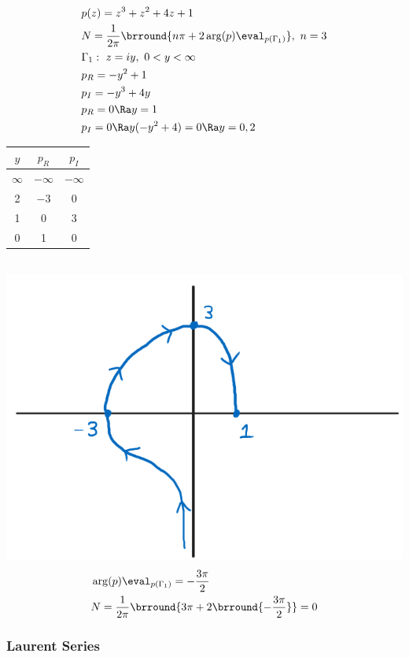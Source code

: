 \begin{align*}
    &p(z)=z^3+z^2+4z+1\\
    &N=\frac{1}{2\pi}\brround{n\pi+2\arg(p)\eval_{p(\Gamma_1)}},\ n=3\\
    &\Gamma_1:\ z=iy,\ 0<y<\infty\\
    &p_R=-y^2+1\\
    &p_I=-y^3+4y\\
    &p_R=0\Ra y=1\\
    &p_I=0\Ra y(-y^2+4)=0\Ra y=0,2
\end{align*}
\begin{tabular}{c|c|c}
    $y$ & $p_R$ & $p_I$\\
    \hline
    $\infty$ & $-\infty$ & $-\infty$\\
    2 & $-3$ & 0\\
    1 & 0 & 3\\
    0 & 1 & 0
\end{tabular}\\
\includegraphics[scale=0.5]{Images/ComplexAnalysisPictures/Q7.png}
\begin{align*}
    &\arg(p)\eval_{p(\Gamma_1)}=-\frac{3\pi}{2}\\
    &N=\frac{1}{2\pi}\brround{3\pi+2\brround{-\frac{3\pi}{2}}}=0
\end{align*}

\subsubsection{Laurent Series}
